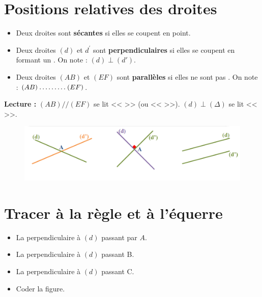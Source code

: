 \section{ Positions relatives des droites}
\begin{itemize}
	\item Deux droites sont \textbf{sécantes} si elles se coupent en \trou{1.2cm} point.
	\item Deux droites $(d)$ et $d^{\prime}$ sont \textbf{perpendiculaires} si elles se coupent en formant un \trou{1.5cm} \trou{1.5cm}. On note : $(d)\perp(d')$.
	\item Deux droites $(AB)$ et $(EF)$ sont \textbf{parallèles} si elles ne sont pas \trou{5cm}. On note : $(AB) \trous{1.5cm} (EF)$.
\end{itemize}

\textbf{Lecture :} $(AB)//(EF)$ se lit << \trou{8cm} >> (ou << \trou{8cm} >>). \quad $(d)\perp(\Delta)$ se lit << \trou{8cm} >>.

\begin{figure}[h]
	\centering
	\includegraphics[width=1\linewidth]{../../assets/images/6e/seq_02/position_relative}
	\label{fig:Position relative de droites}
\end{figure}

\section{ Tracer à la règle et à l'équerre}
\begin{itemize}
	\item La perpendiculaire à $(d)$ passant par $A$.
	\item La perpendiculaire à $(d)$ passant B.
	\item La perpendiculaire à $(d)$ passant C.
	\item Coder la figure.
\end{itemize}

